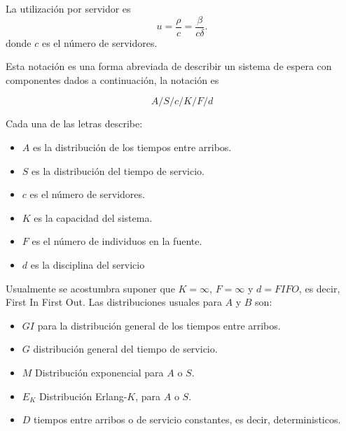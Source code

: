\documentclass{article}
\numberwithin{equation}{section}
\begin{document}
La utilizaci\'on por servidor es
\begin{equation}
u=\frac{\rho}{c}=\frac{\beta}{c\delta}.
\end{equation}
donde $c$ es el n\'umero de servidores.

Esta notaci\'on es una forma abreviada de describir un sistema de espera con componentes dados a continuaci\'on, la notaci\'on es

\begin{equation}\label{Notacion.K.L.}
A/S/c/K/F/d
\end{equation}

Cada una de las letras describe:

\begin{itemize}
\item $A$ es la distribuci\'on de los tiempos entre arribos.
\item $S$ es la distribuci\'on del tiempo de servicio.
\item $c$ es el n\'umero de servidores.
\item $K$ es la capacidad del sistema.
\item $F$ es el n\'umero de individuos en la fuente.
\item $d$ es la disciplina del servicio
\end{itemize}

Usualmente se acostumbra suponer que $K=\infty$, $F=\infty$ y $d=FIFO$, es decir, First In First Out. Las distribuciones usuales para $A$ y $B$ son:

\begin{itemize}
\item $GI$ para la distribuci\'on general de los tiempos entre arribos.
\item $G$ distribuci\'on general del tiempo de servicio.
\item $M$ Distribuci\'on exponencial para $A$ o $S$.
\item $E_{K}$ Distribuci\'on Erlang-$K$, para $A$ o $S$.
\item $D$ tiempos entre arribos o de servicio constantes, es decir, deterministicos.
\end{itemize}


%
\end{document}
